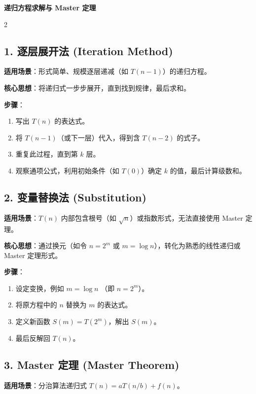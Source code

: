 \documentclass[10pt, a4paper]{article}
\begin{document}
\begin{center}
    \huge\textbf{递归方程求解与 Master 定理}
\end{center}

\begin{multicols*}{2}

\subsection{1. 逐层展开法 (Iteration Method)}
\textbf{适用场景}：形式简单、规模逐层递减（如 $T(n-1)$）的递归方程。

\textbf{核心思想}：将递归式一步步展开，直到找到规律，最后求和。

\textbf{步骤}：
\begin{enumerate}
    \item 写出 $T(n)$ 的表达式。
    \item 将 $T(n-1)$（或下一层）代入，得到含 $T(n-2)$ 的式子。
    \item 重复此过程，直到第 $k$ 层。
    \item 观察通项公式，利用初始条件（如 $T(0)$）确定 $k$ 的值，最后计算级数和。
\end{enumerate}

\subsection{2. 变量替换法 (Substitution)}
\textbf{适用场景}：$T(n)$ 内部包含根号（如 $\sqrt{n}$）或指数形式，无法直接使用 Master 定理。

\textbf{核心思想}：通过换元（如令 $n = 2^m$ 或 $m = \log n$），转化为熟悉的线性递归或 Master 定理形式。

\textbf{步骤}：
\begin{enumerate}
    \item 设定变换，例如 $m = \log n$ （即 $n = 2^m$）。
    \item 将原方程中的 $n$ 替换为 $m$ 的表达式。
    \item 定义新函数 $S(m) = T(2^m)$，解出 $S(m)$。
    \item 最后反解回 $T(n)$。
\end{enumerate}

\subsection{3. Master 定理 (Master Theorem)}
\textbf{适用场景}：分治算法递归式 $T(n) = aT(n/b) + f(n)$。


\end{multicols*}
\end{document}
